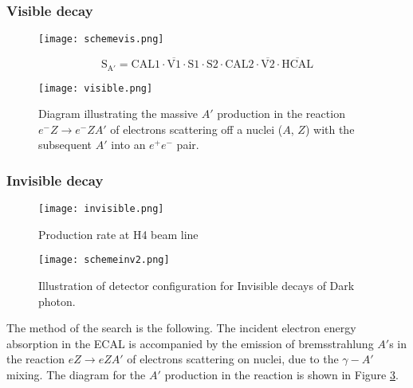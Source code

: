\subsubsection{Visible decay}


\begin{figure}[ht]
	\hspace*{\fill}
	\centering
	\texttt{[image: schemevis.png]}
	\hspace*{\fill}
	\caption{}
	\label{fig:schemevis}
\end{figure}

\begin{equation}
\mathrm{S_{A'} = CAL1 \cdot \overline{V1}\cdot S1\cdot S2\cdot CAL2\cdot \overline{V2}\cdot\overline{HCAL}}
\end{equation}

\begin{figure}[ht]
	\hspace*{\fill}
	\centering
	\texttt{[image: visible.png]}
	\hspace*{\fill}
	\captionsetup{margin=1cm}
	\caption{Diagram illustrating the massive $A'$ production in the reaction $e^-Z\rightarrow e^-ZA'$ of electrons
	scattering off a nuclei ($A$, $Z$) with the subsequent $A'$ into an $e^+e^-$ pair.}\label{fig:vis}
\end{figure}


\subsubsection{Invisible decay}
\begin{figure}[ht]
	\hspace*{\fill}
	\centering
	\texttt{[image: invisible.png]}
	\hspace*{\fill}
	\caption{Production rate at H4 beam line}\label{fig:inv}
\end{figure}

\begin{figure}[ht]
	\hspace*{\fill}
	\centering
	\texttt{[image: schemeinv2.png]}
	\hspace*{\fill}
	\caption{Illustration of detector configuration for Invisible decays of Dark photon.}\label{fig:schemeinv}
\end{figure}

The method of the search is the following. The incident electron energy absorption in the ECAL is accompanied by the
emission of bremsstrahlung $A'$s in the reaction $eZ\rightarrow eZA'$ of electrons scattering on nuclei, due to the
$\gamma - A'$ mixing. The diagram for the $A'$ production in the reaction is shown in Figure \ref{fig:inv}.\par

